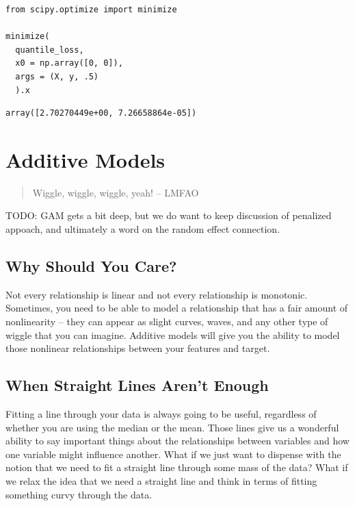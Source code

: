 \documentclass[
  letterpaper,
]{krantz}
\begin{document}
\begin{verbatim}
from scipy.optimize import minimize

minimize(
  quantile_loss, 
  x0 = np.array([0, 0]), 
  args = (X, y, .5)
  ).x
\end{verbatim}

\begin{verbatim}
array([2.70270449e+00, 7.26658864e-05])
\end{verbatim}

\section{Additive Models}\label{sec-gam}

\begin{quote}
Wiggle, wiggle, wiggle, yeah! -- LMFAO
\end{quote}

TODO: GAM gets a bit deep, but we do want to keep discussion of
penalized appoach, and ultimately a word on the random effect
connection.

\subsection{Why Should You Care?}\label{sec-gam-why}

Not every relationship is linear and not every relationship is
monotonic. Sometimes, you need to be able to model a relationship that
has a fair amount of nonlinearity -- they can appear as slight curves,
waves, and any other type of wiggle that you can imagine. Additive
models will give you the ability to model those nonlinear relationships
between your features and target.

\subsection{When Straight Lines Aren't Enough}\label{sec-gam-curve}

Fitting a line through your data is always going to be useful,
regardless of whether you are using the median or the mean. Those lines
give us a wonderful ability to say important things about the
relationships between variables and how one variable might influence
another. What if we just want to dispense with the notion that we need
to fit a straight line through some mass of the data? What if we relax
the idea that we need a straight line and think in terms of fitting
something curvy through the data.
\end{document}
